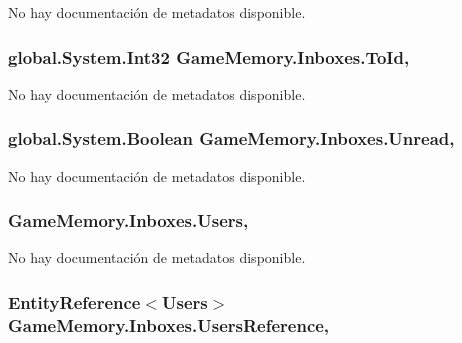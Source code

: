 No hay documentación de metadatos disponible. 

\hypertarget{class_game_memory_1_1_inboxes_a198041e29fa5ce1049faf5d86a1adc8d}{
\subsubsection[{To\-Id}]{\setlength{\rightskip}{0pt plus 5cm}global.\-System.\-Int32 Game\-Memory.\-Inboxes.\-To\-Id\hspace{0.3cm}{\ttfamily [get]}, {\ttfamily [set]}}}\label{class_game_memory_1_1_inboxes_a198041e29fa5ce1049faf5d86a1adc8d}


No hay documentación de metadatos disponible. 

\hypertarget{class_game_memory_1_1_inboxes_ae67bb69c77c4981be67a1c0f993df287}{
\subsubsection[{Unread}]{\setlength{\rightskip}{0pt plus 5cm}global.\-System.\-Boolean Game\-Memory.\-Inboxes.\-Unread\hspace{0.3cm}{\ttfamily [get]}, {\ttfamily [set]}}}\label{class_game_memory_1_1_inboxes_ae67bb69c77c4981be67a1c0f993df287}


No hay documentación de metadatos disponible. 

\hypertarget{class_game_memory_1_1_inboxes_a5c16a080fdccc957c58acf200f1b52b1}{
\subsubsection[{Users}]{ Game\-Memory.\-Inboxes.\-Users\hspace{0.3cm}{\ttfamily [get]}, {\ttfamily [set]}}}\label{class_game_memory_1_1_inboxes_a5c16a080fdccc957c58acf200f1b52b1}


No hay documentación de metadatos disponible. 

\hypertarget{class_game_memory_1_1_inboxes_a61ad83251581c2d87e830ee9fcfdeb46}{
\subsubsection[{Users\-Reference}]{\setlength{\rightskip}{0pt plus 5cm}Entity\-Reference$<${\bf Users}$>$ Game\-Memory.\-Inboxes.\-Users\-Reference\hspace{0.3cm}{\ttfamily [get]}, {\ttfamily [set]}}}\label{class_game_memory_1_1_inboxes_a61ad83251581c2d87e830ee9fcfdeb46}


